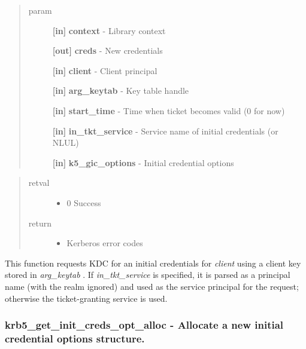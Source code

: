 \documentclass[letterpaper,10pt,english]{sphinxmanual}
\begin{document}
\begin{quote}\begin{description}
\item[{param}] \leavevmode
\textbf{{[}in{]}} \textbf{context} - Library context

\textbf{{[}out{]}} \textbf{creds} - New credentials

\textbf{{[}in{]}} \textbf{client} - Client principal

\textbf{{[}in{]}} \textbf{arg\_keytab} - Key table handle

\textbf{{[}in{]}} \textbf{start\_time} - Time when ticket becomes valid (0 for now)

\textbf{{[}in{]}} \textbf{in\_tkt\_service} - Service name of initial credentials (or NLUL)

\textbf{{[}in{]}} \textbf{k5\_gic\_options} - Initial credential options

\end{description}\end{quote}
\begin{quote}\begin{description}
\item[{retval}] \leavevmode\begin{itemize}
\item {} 
0   Success

\end{itemize}

\item[{return}] \leavevmode\begin{itemize}
\item {} 
Kerberos error codes

\end{itemize}

\end{description}\end{quote}

This function requests KDC for an initial credentials for \emph{client} using a client key stored in \emph{arg\_keytab} . If \emph{in\_tkt\_service} is specified, it is parsed as a principal name (with the realm ignored) and used as the service principal for the request; otherwise the ticket-granting service is used.


\subsubsection{krb5\_get\_init\_creds\_opt\_alloc -  Allocate a new initial credential options structure.}
\label{appdev/refs/api/krb5_get_init_creds_opt_alloc:krb5-get-init-creds-opt-alloc-allocate-a-new-initial-credential-options-structure}\label{appdev/refs/api/krb5_get_init_creds_opt_alloc::doc}
\end{document}
